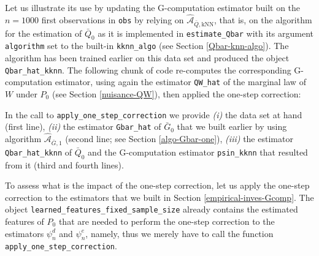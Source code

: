 \documentclass[11pt,openright,twoside]{book}
\newenvironment{Shaded}{\begin{snugshade}}{\end{snugshade}}
\newcommand{\CommentTok}[1]{\textcolor[rgb]{0.56,0.35,0.01}{\textit{#1}}}
\newcommand{\FloatTok}[1]{\textcolor[rgb]{0.00,0.00,0.81}{#1}}
\newcommand{\KeywordTok}[1]{\textcolor[rgb]{0.13,0.29,0.53}{\textbf{#1}}}
\newcommand{\NormalTok}[1]{#1}
\newcommand{\OperatorTok}[1]{\textcolor[rgb]{0.81,0.36,0.00}{\textbf{#1}}}
\newcommand{\OtherTok}[1]{\textcolor[rgb]{0.56,0.35,0.01}{#1}}
\newcommand{\StringTok}[1]{\textcolor[rgb]{0.31,0.60,0.02}{#1}}
\newcommand{\Algo}{\widehat{\mathcal{A}}}
\newcommand{\Gbar}{\bar{G}}
\newcommand{\Qbar}{\bar{Q}}
\theoremstyle{definition}
\theoremstyle{definition}
\theoremstyle{definition}
\theoremstyle{remark}
\begin{document}
Let us illustrate its use by updating the G-computation estimator built on the
\(n=1000\) first observations in \texttt{obs} by relying on \(\Algo_{\Qbar,\text{kNN}}\),
that is, on the algorithm for the estimation of \(\Qbar_{0}\) as it is
implemented in \texttt{estimate\_Qbar} with its argument \texttt{algorithm} set to the
built-in \texttt{kknn\_algo} (see Section \ref{Qbar-knn-algo}). The algorithm has
been trained earlier on this data set and produced the object \texttt{Qbar\_hat\_kknn}.
The following chunk of code re-computes the corresponding G-computation
estimator, using again the estimator \texttt{QW\_hat} of the marginal law of \(W\) under
\(P_{0}\) (see Section \ref{nuisance-QW}), then applied the one-step correction:

\begin{Shaded}
\end{Shaded}

In the call to \texttt{apply\_one\_step\_correction} we provide \emph{(i)} the data set at
hand (first line), \emph{(ii)} the estimator \texttt{Gbar\_hat} of \(\Gbar_{0}\) that we
built earlier by using algorithm \(\Algo_{\Gbar,1}\) (second line; see Section
\ref{algo-Gbar-one}), \emph{(iii)} the estimator \texttt{Qbar\_hat\_kknn} of \(\Qbar_{0}\)
and the G-computation estimator \texttt{psin\_kknn} that resulted from it (third and
fourth lines).

To assess what is the impact of the one-step correction, let us apply the
one-step correction to the estimators that we built in Section
\ref{empirical-inves-Gcomp}. The object \texttt{learned\_features\_fixed\_sample\_size}
already contains the estimated features of \(P_{0}\) that are needed to perform
the one-step correction to the estimators \(\psi_{n}^{d}\) and \(\psi_{n}^{e}\),
namely, thus we merely have to call the function \texttt{apply\_one\_step\_correction}.
\end{document}
